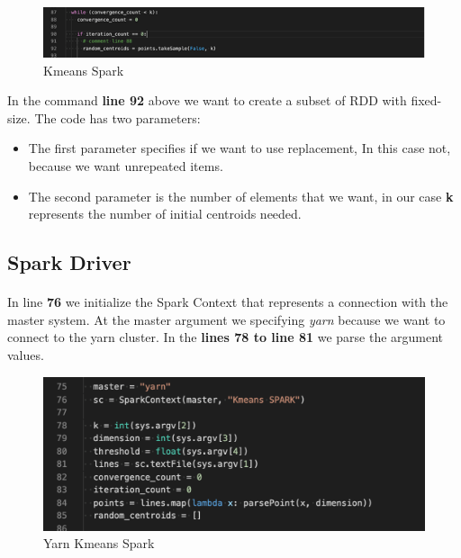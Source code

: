 \documentclass{book}
\begin{document}
    \begin{figure}[H]
        \includegraphics[width=12cm]{code/convergence_count_small}
        \centering
        \caption{Kmeans Spark}
    \end{figure}

    In the command \textbf{line 92} above we want to create a subset of RDD with fixed-size. The code has two parameters: 
    \begin{itemize}
        \item The first parameter specifies if we want to use replacement, In this case not, because we want unrepeated items. 
        \item The second parameter is the number of elements that we want, in our case \textbf{k} represents the number of initial centroids needed. 
    \end{itemize}

    \subsection{Spark Driver}
    \paragraph{}

   In line \textbf{76} we initialize the Spark Context that represents a connection with the master system. At the master argument we specifying \textit{yarn} because we want to connect to the yarn cluster. In the \textbf{lines 78 to line 81} we parse the argument values. 

    \begin{figure}[H]
        \includegraphics[width=12cm]{code/kmeans-spark}
        \centering
        \caption{Yarn Kmeans Spark}
    \end{figure}
\end{document}
